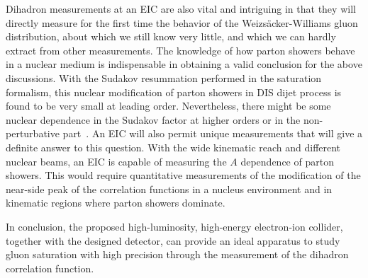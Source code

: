 Dihadron measurements at an EIC are also vital and intriguing in
that they will directly measure for the first time the behavior of the Weizs\"{a}cker-Williams
gluon distribution, about which we still know very little, and which we
can hardly extract from other measurements. The knowledge of how parton showers
behave in a nuclear medium is indispensable in obtaining a valid conclusion for the
above discussions. With the Sudakov resummation performed in the saturation
formalism, this nuclear modification of parton showers in DIS dijet process is
found to be very small at leading order. Nevertheless, there might be some
nuclear dependence in the Sudakov factor at higher orders or in the
non-perturbative part~\cite{Kang:2012am}. An EIC will also permit unique measurements
that will give a definite answer to this question. With the wide kinematic
reach and different nuclear beams, an EIC is capable of measuring the $A$
dependence of parton showers. This would require quantitative measurements of
the modification of the near-side peak of the correlation functions in a 
nucleus environment and in kinematic regions where parton showers dominate.

In conclusion, the proposed high-luminosity, high-energy electron-ion collider,
together with the designed detector, can provide an ideal apparatus to study
gluon saturation with high precision through the measurement of 
the dihadron correlation function.



